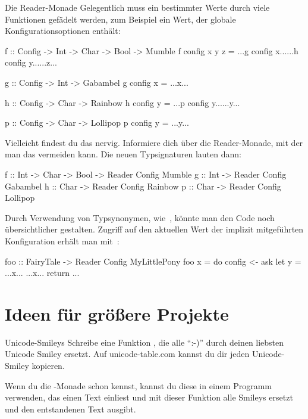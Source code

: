 \documentclass{uebblatt}
\begin{document}
\begin{aufgabe}{Die Reader-Monade}
Gelegentlich muss ein bestimmter Werte durch viele Funktionen gefädelt werden,
zum Beispiel ein Wert, der globale Konfigurationsoptionen enthält:
\begin{haskellcode}
f :: Config -> Int -> Char -> Bool -> Mumble
f config x y z = ...g config x......h config y......z...

g :: Config -> Int -> Gabambel
g config x     = ...x...

h :: Config -> Char -> Rainbow
h config y     = ...p config y......y...

p :: Config -> Char -> Lollipop
p config y     = ...y...
\end{haskellcode}
Vielleicht findest du das nervig. Informiere dich über die Reader-Monade, mit
der man das vermeiden kann. Die neuen Typsignaturen lauten dann:
\begin{haskellcode}
f :: Int -> Char -> Bool -> Reader Config Mumble
g :: Int -> Reader Config Gabambel
h :: Char -> Reader Config Rainbow
p :: Char -> Reader Config Lollipop
\end{haskellcode}
Durch Verwendung von Typsynonymen, wie~,
könnte man den Code noch übersichtlicher gestalten. Zugriff auf den aktuellen
Wert der implizit mitgeführten Konfiguration erhält man mit~:
\begin{haskellcode}
foo :: FairyTale -> Reader Config MyLittlePony
foo x = do
    config <- ask
    let y = ...x...
    ...x...
    return ...
\end{haskellcode}
\end{aufgabe}


\section{Ideen für größere Projekte}

\begin{aufgabe}{Unicode-Smileys}
	Schreibe eine Funktion , die alle "`:-)"' durch deinen liebsten Unicode Smiley ersetzt. Auf unicode-table.com kannst du dir jeden Unicode-Smiley kopieren.

	Wenn du die -Monade schon kennst, kannst du diese in einem Programm verwenden, das einen Text einliest und mit dieser Funktion alle Smileys ersetzt und den entstandenen Text ausgibt.
\end{aufgabe}
\end{document}
